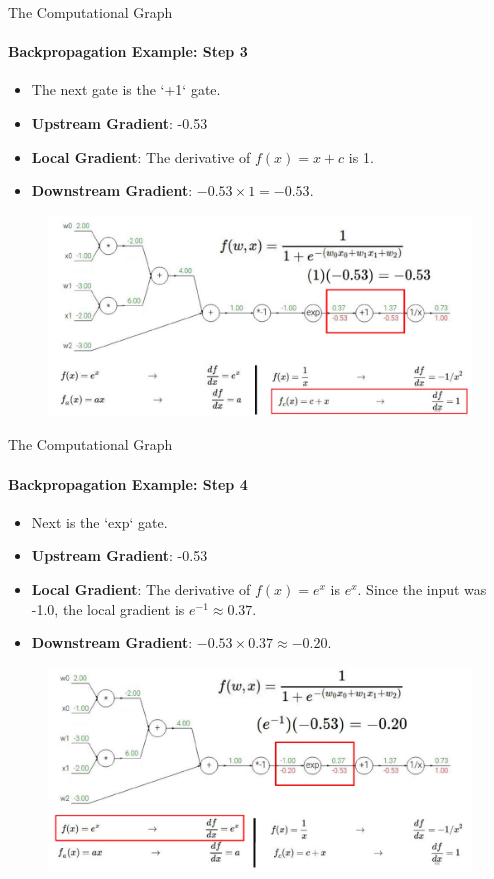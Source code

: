 \begin{frame}{The Computational Graph}
    \framesubtitle{Backpropagation Example: Step 3}
    \begin{itemize}
        \item The next gate is the `+1` gate.
        \item \textbf{Upstream Gradient}: -0.53
        \item \textbf{Local Gradient}: The derivative of $f(x) = x+c$ is 1.
        \item \textbf{Downstream Gradient}: $-0.53 \times 1 = -0.53$.
    \end{itemize}
    \begin{figure}
        \centering
        \includegraphics[width=\linewidth]{images/sigmoid_backprop_3.png}
    \end{figure}
\end{frame}

\begin{frame}{The Computational Graph}
    \framesubtitle{Backpropagation Example: Step 4}
    \small
    \begin{itemize}
        \item Next is the `exp` gate.
        \item \textbf{Upstream Gradient}: -0.53
        \item \textbf{Local Gradient}: The derivative of $f(x) = e^x$ is $e^x$. Since the input was -1.0, the local gradient is $e^{-1} \approx 0.37$.
        \item \textbf{Downstream Gradient}: $-0.53 \times 0.37 \approx -0.20$.
    \end{itemize}
    \begin{figure}
        \centering
        \includegraphics[width=\linewidth]{images/sigmoid_backprop_4.png}
    \end{figure}
\end{frame}

